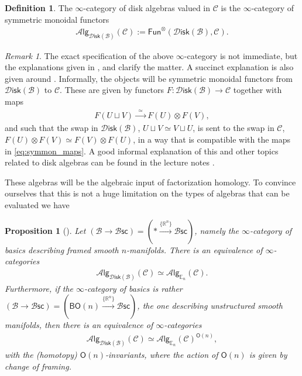 \documentclass[12pt,a4paper]{article}
\newcounter{counter} \numberwithin{counter}{section}
\theoremstyle{definition}
\newtheorem{definition}[counter]{Definition}
\theoremstyle{plain}
\newtheorem{proposition}[counter]{Proposition}
\theoremstyle{remark}
\newtheorem{remark}[counter]{Remark}
\newcommand{\catC}{\mathscr{C}}
\newcommand{\disk}{\mathscr{D} \mathsf{isk}}
\newcommand{\alg}[1]{\mathscr{A} \mathsf{lg}_{#1}}
\newcommand{\bsc}{\mathscr{B} \mathsf{sc}}
\newcommand{\bstr}{\mathscr{B}}
\begin{document}
\begin{definition}
    The $\infty$-category of disk algebras valued in $\catC$ is the $\infty$-category of symmetric monoidal functors
    \begin{align}
        \alg{\disk(\bstr)} (\catC) := \mathsf{Fun}^{\otimes}(\disk(\bstr), \catC).
    \end{align}
\end{definition}

\begin{remark}
    The exact specification of the above $\infty$-category is not immediate, but the explanations given in \cite[def.2.0.0.7]{lurie_ha}, \cite[rem.2.1.2.19]{lurie_ha} and \cite[def.2.1.3.7]{lurie_ha} clarify the matter. A succinct explanation is also given around \cite[def.1.11]{aft_fhstrat}. Informally, the objects will be symmetric monoidal functors from $\disk(\bstr)$ to $\catC$. These are given by functors $F:\disk(\bstr) \rightarrow \catC$ together with maps
    \begin{align}\label{eq:symmon_maps}
        F(U \sqcup V) \xrightarrow{\ \ \simeq \ \ } F(U) \otimes F(V),
    \end{align}
    and such that the swap in $\disk(\bstr)$, $U \sqcup V \simeq V \sqcup U$, is sent to the swap in $\catC$, $F(U) \otimes F(V) \simeq F(V) \otimes F(U)$, in a way that is compatible with the maps in \cref{eq:symmon_maps}. A good informal explanation of this and other topics related to disk algebras can be found in the lecture notes \cite{tanaka20}.
\end{remark}

These algebras will be the algebraic input of factorization homology. To convince ourselves that this is not a huge limitation on the types of algebras that can be evaluated we have
%
\begin{proposition}[{\cite[prop.2.12]{aft_fhstrat}}]\label{prop:framed_ndisk=En}
    Let $(\bstr \rightarrow \bsc) = (* \xrightarrow{\{ \mathbb{R}^n\}} \bsc)$, namely the $\infty$-category of basics describing framed smooth $n$-manifolds. There is an equivalence of $\infty$-categories
    \begin{align}
        \alg{\disk(\bstr)} (\catC) \simeq \alg{\mathbb{E}_n} (\catC).
    \end{align}
    Furthermore, if the $\infty$-category of basics is rather $(\bstr \rightarrow \bsc) = (\mathsf{BO}(n) \xrightarrow{\{ \mathbb{R}^n\}} \bsc)$, the one describing unstructured smooth manifolds, then there is an equivalence of $\infty$-categories
    \begin{align}
        \alg{\disk(\bstr)} (\catC) \simeq \alg{\mathbb{E}_n}(\catC)^{\mathsf{O}(n)},
    \end{align}
    with the (homotopy) $\mathsf{O}(n)$-invariants, where the action of $\mathsf{O}(n)$ is given by change of framing.
\end{proposition}
\end{document}
